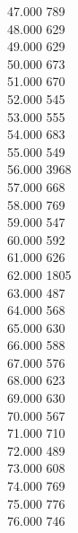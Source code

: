 { 47.000	789 \\
 48.000	629 \\
 49.000	629 \\
 50.000	673 \\
 51.000	670 \\
 52.000	545 \\
 53.000	555 \\
 54.000	683 \\
 55.000	549 \\
 56.000	3968 \\
 57.000	668 \\
 58.000	769 \\
 59.000	547 \\
 60.000	592 \\
 61.000	626 \\
 62.000	1805 \\
 63.000	487 \\
 64.000	568 \\
 65.000	630 \\
 66.000	588 \\
 67.000	576 \\
 68.000	623 \\
 69.000	630 \\
 70.000	567 \\
 71.000	710 \\
 72.000	489 \\
 73.000	608 \\
 74.000	769 \\
 75.000	776 \\
 76.000	746 \\
}
